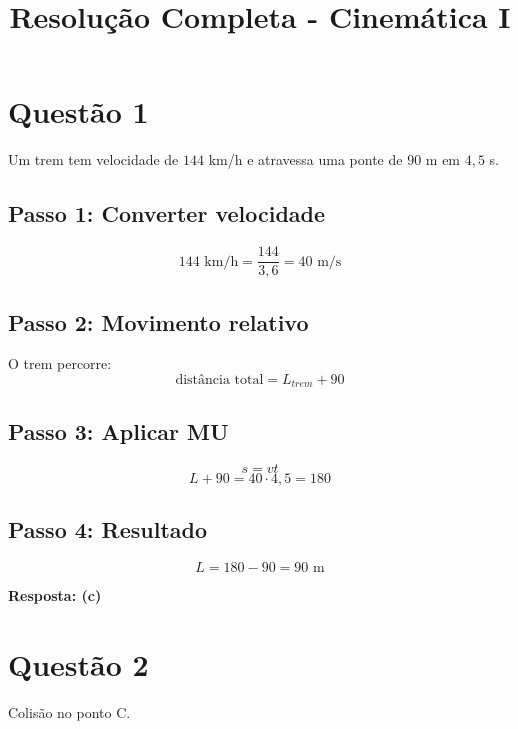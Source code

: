 \documentclass[a4paper,12pt]{article}
\title{Resolução Completa - Cinemática I}
\author{}
\date{}
\begin{document}
\maketitle

\section*{Questão 1}

Um trem tem velocidade de $144$ km/h e atravessa uma ponte de $90$ m em $4{,}5$ s.

\subsection*{Passo 1: Converter velocidade}
\begin{equation}
144 \text{ km/h} = \frac{144}{3,6} = 40 \text{ m/s}
\end{equation}

\subsection*{Passo 2: Movimento relativo}
O trem percorre:
\begin{equation}
\text{distância total} = L_{trem} + 90
\end{equation}

\subsection*{Passo 3: Aplicar MU}
\begin{equation}
s = vt
\end{equation}
\begin{equation}
L + 90 = 40 \cdot 4{,}5 = 180
\end{equation}

\subsection*{Passo 4: Resultado}
\begin{equation}
L = 180 - 90 = 90 \text{ m}
\end{equation}

\textbf{Resposta: (c)}

\newpage

\section*{Questão 2}

Colisão no ponto C.
\end{document}
